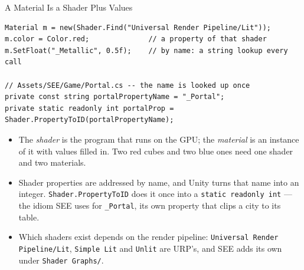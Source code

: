 \begin{frame}[fragile]{A Material Is a Shader Plus Values}
  \begin{lstlisting}[basicstyle=\scriptsize\ttfamily]
Material m = new(Shader.Find("Universal Render Pipeline/Lit"));
m.color = Color.red;              // a property of that shader
m.SetFloat("_Metallic", 0.5f);    // by name: a string lookup every call

// Assets/SEE/Game/Portal.cs -- the name is looked up once
private const string portalPropertyName = "_Portal";
private static readonly int portalProp = Shader.PropertyToID(portalPropertyName);
  \end{lstlisting}
  \vspace{1ex}

  \begin{itemize}
    \item The \emph{shader} is the program that runs on the GPU; the
      \emph{material} is an instance of it with values filled in. Two red
      cubes and two blue ones need one shader and two materials.
    \item Shader properties are addressed by name, and Unity turns that name
      into an integer. \texttt{Shader.PropertyToID} does it once into a
      \texttt{static readonly int} --- the idiom SEE uses for
      \texttt{\_Portal}, its own property that clips a city to its table.
    \item Which shaders exist depends on the render pipeline:
      \texttt{Universal Render Pipeline/Lit}, \texttt{Simple Lit} and
      \texttt{Unlit} are URP's, and SEE adds its own under
      \texttt{Shader Graphs/}.
  \end{itemize}
\end{frame}

